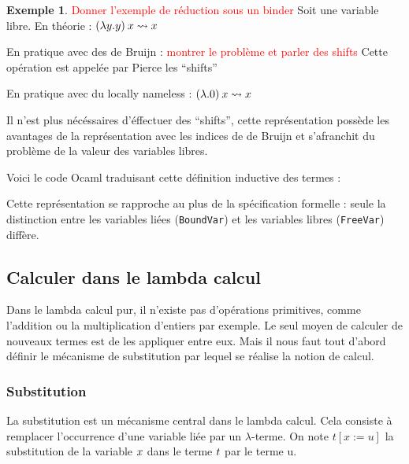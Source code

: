 \documentclass {article}
\newcommand{\codefrom}[3]
           {}
\theoremstyle{definition}
\newtheorem{example}{Exemple}
\theoremstyle{remark}
\newcommand{\todo}[1]{\textcolor{red}{#1}}
\begin{document}
\begin{example}
  \todo{Donner l'exemple de réduction sous un binder}
  Soit  une variable libre. 
  En théorie : 
  \((\lambda y. y)\:x \leadsto x\)

  En pratique avec des de Bruijn : \todo{montrer le problème et parler des shifts}
  Cette opération est appelée par Pierce les ``shifts''

  En pratique avec du locally nameless : $(\lambda . 0)\:x\leadsto x$

  Il n'est plus nécéssaires d'éffectuer des ``shifts'', cette représentation
  possède les avantages de la représentation avec les indices de de Bruijn et
  s'afranchit du problème de la valeur des variables libres.
  
\end{example}

Voici le code Ocaml traduisant cette définition inductive des termes :
%
\codefrom{untyped}{lambda}{untyped_term}

Cette représentation se rapproche au plus de la spécification formelle
: seule la distinction entre les variables liées (\lstinline!BoundVar!)
et les variables libres (\lstinline!FreeVar!) diffère.



  
\subsection{Calculer dans le lambda calcul}
\label{calculer_dans_le_lambda_calcul}

Dans le lambda calcul pur, il n'existe pas d'opérations primitives, comme l'addition ou la multiplication d'entiers par exemple. Le seul moyen de calculer de nouveaux termes est de les appliquer 
entre eux. Mais il nous faut tout d'abord définir le mécanisme de substitution par lequel se réalise la notion de calcul.

\subsubsection{Substitution}

\newcommand{\subst}[3]{#1[#2 := #3]}


La substitution est un mécanisme central dans le lambda calcul. Cela consiste 
à remplacer l'occurrence d'une variable liée par un \(\lambda\)-terme.
On note \(\subst{t}{x}{u}\) la substitution de la variable $x$ dans le terme $t$ par le 
terme u.
\end{document}
